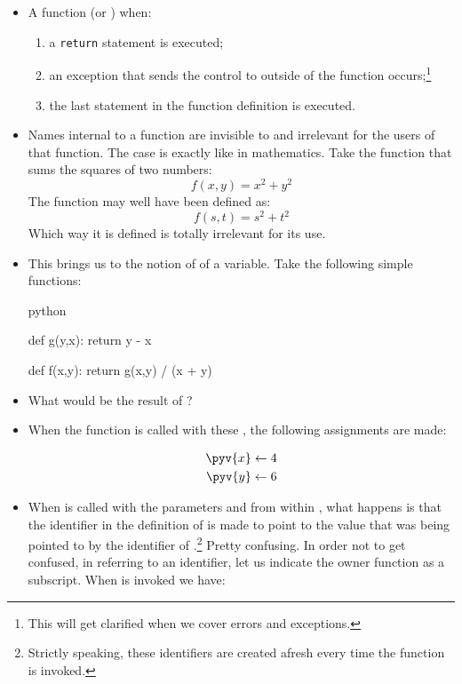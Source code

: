 \documentclass[a4paper]{article}
\begin{document}
\begin{itemize}
\item A function  (or ) when:
	\begin{enumerate}
	\item a \Verb+return+ statement is executed;
	\item an exception that sends the control to outside of the function
	occurs;\footnote{This will get clarified when we cover errors and
	exceptions.}
	\item the last statement in the function definition is executed. 
	\end{enumerate}
\end{itemize}

\begin{itemize}
\item Names internal to a function are invisible to and irrelevant for the users
of that function. The case is exactly like in mathematics. Take the function
that sums the squares of two numbers: 
$$f(x,y) = x^2 + y^2$$
The function may well have been defined as:
$$f(s,t) = s^2 + t^2$$
Which way it is defined is totally irrelevant for its use. 

\item This brings us to the notion of  of a variable. Take the
following simple functions:

\begin{ucodeframe}
\begin{pygments}[frame=none]{python}

def g(y,x):
	return y - x 

def f(x,y):
	return g(x,y) / (x + y)

\end{pygments}
\end{ucodeframe}

\item[] What would be the result of ? 
\item[] When the function  is called with these , the
following assignments are made:

\begin{align*}
\pyv{x}\leftarrow 4\\
\pyv{y}\leftarrow 6
\end{align*}

\item[] When  is called with the parameters  and  from
within , what happens is that the identifier  in the definition of
 is made to point to the value that was being pointed to by the
identifier  of .\footnote{Strictly speaking, these identifiers are
created afresh every time the function is invoked.} Pretty confusing.  In order
not to get confused, in referring to an identifier, let us indicate the owner
function as a subscript.  When  is invoked we have:


\end{itemize}
\end{document}
